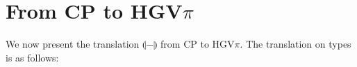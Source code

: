 \documentclass{easychair}
\makeatletter
\newcommand{\ba}{\begin{array}}
\newcommand{\ea}{\end{array}}
\newenvironment{eqs}{\ba{@{}r@{~}c@{~}l@{}}}{\ea}
\newcommand{\key}{\mathsf}
\newcommand{\set}[1]{\{ #1 \}}
\newcommand{\cptogv}[1]{\llparenthesis{#1}\rrparenthesis}
\newcommand{\row}[2]{\set{#1}_{#2}}
\newcommand{\gvOutput}[2]{\mathord{!}{#1}.{#2}}
\newcommand{\gvInput}[2]{\mathord{?}{#1}.{#2}}
\newcommand{\gvEndOutput}{\key{end}_!}
\newcommand{\gvEndInput}{\key{end}_?}
\newcommand{\gvPlus}[2]{\oplus \row{#1}{#2}}
\newcommand{\gvChoice}[2]{\binampersand \row{#1}{#2}}
\newcommand{\gvServer}[1]{\flat {#1}}
\newcommand{\gvService}[1]{\sharp {#1}}
\newcommand{\gvDual}[1]{\overline{#1}}
\newcommand{\gvOutputType}[2]{![{#1}].{#2}}
\newcommand{\gvInputType}[2]{?[{#1}].{#2}}
\newcommand{\la}{l}
\newcommand{\cpTimes}[2]{{#1} \otimes {#2}}
\newcommand{\cpPar}[2]{{#1} \mathbin{\bindnasrepma} {#2}}
\newcommand{\cpPlus}[2]{\oplus \row{#1}{#2}}
\newcommand{\cpWith}[2]{\binampersand \row{#1}{#2}}
\newcommand{\cpOne}{1}
\newcommand{\cpBottom}{\bot}
\newcommand{\cpOfCourse}[1]{\mathord{!}{#1}}
\newcommand{\cpWhyNot}[1]{\mathord{?}{#1}}
\newcommand{\cpDual}[1]{{#1}^\bot}
\newcommand{\cpExists}[2]{\exists {#1}.{#2}}
\newcommand{\cpForall}[2]{\forall {#1}.{#2}}
\newcommand{\hgv}{HGV\xspace}
\newcommand{\hgvpi}{HGV$\pi$\xspace}
\makeatother
\begin{document}
\section{From CP to \hgvpi}
\label{sect:cp-to-hgvpi}

We now present the translation $\cptogv{-}$ from CP to \hgvpi. The translation on types is as
follows:
\end{document}
